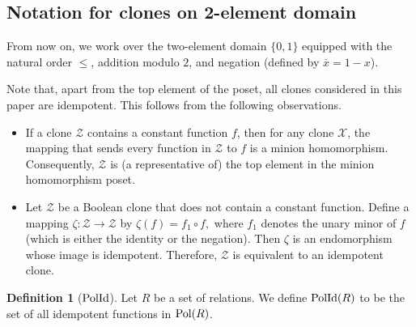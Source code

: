 \documentclass{amsart}
\numberwithin{equation}{section}
\theoremstyle{plain}
\theoremstyle{definition}
\newtheorem{definition}[theorem]{Definition}
\def\clone#1{\mathcal{#1}}
\def\Pol{{\rm Pol}}
\def\PolId{{\rm PolId}}
\begin{document}
\subsection{Notation for clones on 2-element domain}

From now on, we work over the two-element domain $\{0,1\}$ equipped with the natural order $\leq$, addition modulo $2$, and negation (defined by $\overline{x}=1-x$). 

Note that, apart from the top element of the poset, all clones considered in this paper are idempotent. This follows from the following observations.
\begin{itemize}
  \item If a clone $\clone{Z}$ contains a constant function $f$, then for any clone $\clone{X}$, the mapping that sends every function in $\clone{Z}$ to $f$ is a minion homomorphism. Consequently, $\clone{Z}$ is (a representative of) the top element in the minion homomorphism poset.
  \item Let $\clone{Z}$ be a Boolean clone that does not contain a constant function. Define a mapping $\zeta:\clone{Z}\to\clone{Z}$  by $\zeta(f) = f_1\circ f,$ where $f_1$ denotes the unary minor of $f$ (which is either the identity or the negation). Then $\zeta$ is an endomorphism whose image is idempotent. Therefore, $\clone{Z}$ is equivalent to an idempotent clone.  
\end{itemize}

\begin{definition}[$\PolId$] Let $R$ be a set of relations. We define $\PolId(R)$ to be the set of all idempotent functions in $\Pol(R)$. \end{definition}
\end{document}
